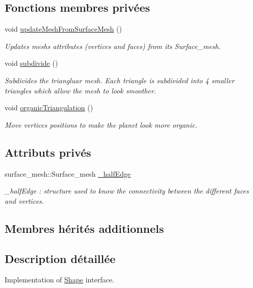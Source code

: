 \subsection*{Fonctions membres privées}
\begin{DoxyCompactItemize}
\item 
void \hyperlink{class_icosphere_a38645b095ea6895c2aa5bbff7d8edf20}{update\+Mesh\+From\+Surface\+Mesh} ()
\begin{DoxyCompactList}\small\item\em Updates mesh\textquotesingle{}s attributes (vertices and faces) from its Surface\+\_\+mesh. \end{DoxyCompactList}\item 
void \hyperlink{class_icosphere_a1086e13d1300ed79bf201d2570eb7ebe}{subdivide} ()
\begin{DoxyCompactList}\small\item\em Subdivides the triangluar mesh. Each triangle is subdivided into 4 smaller triangles which allow the mesh to look smoother. \end{DoxyCompactList}\item 
void \hyperlink{class_icosphere_ab3470de718fee359ef4691e0c2ee987a}{organic\+Triangulation} ()
\begin{DoxyCompactList}\small\item\em Move vertices positions to make the planet look more organic. \end{DoxyCompactList}\end{DoxyCompactItemize}
\subsection*{Attributs privés}
\begin{DoxyCompactItemize}
\item 
surface\+\_\+mesh\+::\+Surface\+\_\+mesh \hyperlink{class_icosphere_a454cb570544ec34a65e2f3753fd3dc14}{\+\_\+half\+Edge}
\begin{DoxyCompactList}\small\item\em \+\_\+half\+Edge \+: structure used to know the connectivity between the different faces and vertices. \end{DoxyCompactList}\end{DoxyCompactItemize}
\subsection*{Membres hérités additionnels}


\subsection{Description détaillée}
Implementation of \hyperlink{class_shape}{Shape} interface. 


